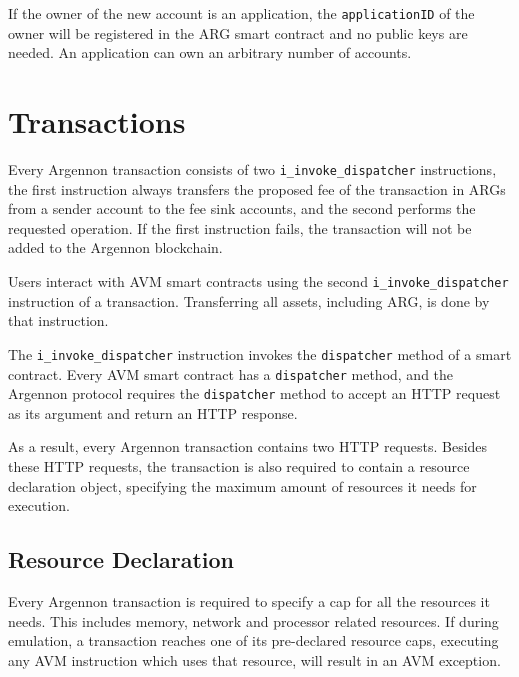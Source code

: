 If the owner of the new account is an application, the \texttt{applicationID} of the owner will be registered in the
ARG smart contract and no public keys are needed. An application can own an arbitrary number of accounts.



\section{Transactions}\label{sec:transactions}

Every Argennon transaction consists of two \texttt{i\_invoke\_dispatcher} instructions, the first instruction always
transfers the proposed fee of the transaction in ARGs from a sender account to the fee sink accounts, and
the second performs the requested operation. If the first instruction fails, the transaction will not be added to
the Argennon blockchain.

Users interact with AVM smart contracts using
the second \texttt{i\_invoke\_dispatcher} instruction of a transaction.
Transferring all assets, including ARG, is done by that instruction.

The \texttt{i\_invoke\_dispatcher} instruction invokes the \texttt{dispatcher} method of a smart contract. Every AVM
smart contract has a \texttt{dispatcher} method, and the Argennon protocol requires
the \texttt{dispatcher} method to accept an HTTP request as its argument and
return an HTTP response.

As a result, every Argennon transaction contains two HTTP requests. Besides these HTTP requests, the
transaction is also required to contain a resource declaration object, specifying the maximum amount of resources
it needs for execution.


\subsection{Resource Declaration}\label{subsec:resource-declaration}

Every Argennon transaction is required to specify a cap for all the resources it needs. This
includes memory, network and processor related resources. If during emulation, a transaction reaches one of its
pre-declared resource caps, executing any AVM instruction which uses that resource, will result in an AVM exception.

